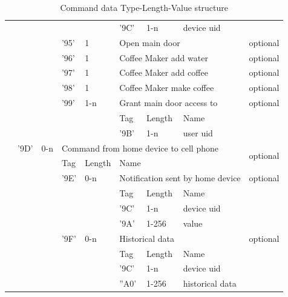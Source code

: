 \begin{table}[!htb]
{\begin{tabular}{|l|l|l|l|l|l|l|l|l|l|}
\multicolumn{2}{|l|}{} & \multicolumn{2}{l|}{} & \multicolumn{2}{l|}{} & '9C' & 1-n & device uid &  \\ \cline{5-10} 
\multicolumn{2}{|l|}{} & \multicolumn{2}{l|}{} & '95' & 1 & \multicolumn{3}{l|}{Open main door} & optional \\ \cline{5-10} 
\multicolumn{2}{|l|}{} & \multicolumn{2}{l|}{} & '96' & 1 & \multicolumn{3}{l|}{Coffee Maker add water} & optional \\ \cline{5-10} 
\multicolumn{2}{|l|}{} & \multicolumn{2}{l|}{} & '97' & 1 & \multicolumn{3}{l|}{Coffee Maker add coffee} & optional \\ \cline{5-10} 
\multicolumn{2}{|l|}{} & \multicolumn{2}{l|}{} & '98' & 1 & \multicolumn{3}{l|}{Coffee Maker make coffee} & optional \\ \cline{5-10} 
\multicolumn{2}{|l|}{} & \multicolumn{2}{l|}{} & '99' & 1-n & \multicolumn{3}{l|}{Grant main door access to} & optional \\ \cline{5-10} 
\multicolumn{2}{|l|}{} & \multicolumn{2}{l|}{} & \multicolumn{2}{l|}{\multirow{2}{*}{}} & Tag & Length & Name & \multirow{2}{*}{} \\ \cline{7-9}
\multicolumn{2}{|l|}{} & \multicolumn{2}{l|}{} & \multicolumn{2}{l|}{} & '9B' & 1-n & user uid &  \\ \cline{3-10} 
\multicolumn{2}{|l|}{} & '9D' & 0-n & \multicolumn{5}{l|}{Command from home device to cell phone} & \multirow{2}{*}{optional} \\ \cline{3-9}
\multicolumn{2}{|l|}{} & \multicolumn{2}{l|}{\multirow{9}{*}{}} & Tag & Length & \multicolumn{3}{l|}{Name} &  \\ \cline{5-10} 
\multicolumn{2}{|l|}{} & \multicolumn{2}{l|}{} & '9E' & 0-n & \multicolumn{3}{l|}{Notification sent by home device} & optional \\ \cline{5-10} 
\multicolumn{2}{|l|}{} & \multicolumn{2}{l|}{} & \multicolumn{2}{l|}{\multirow{3}{*}{}} & Tag & Length & Name & \multirow{3}{*}{} \\ \cline{7-9}
\multicolumn{2}{|l|}{} & \multicolumn{2}{l|}{} & \multicolumn{2}{l|}{} & '9C' & 1-n & device uid &  \\ \cline{7-9}
\multicolumn{2}{|l|}{} & \multicolumn{2}{l|}{} & \multicolumn{2}{l|}{} & '9A' & 1-256 & value &  \\ \cline{5-10} 
\multicolumn{2}{|l|}{} & \multicolumn{2}{l|}{} & '9F' & 0-n & \multicolumn{3}{l|}{Historical data} & optional \\ \cline{5-10} 
\multicolumn{2}{|l|}{} & \multicolumn{2}{l|}{} & \multicolumn{2}{l|}{\multirow{3}{*}{}} & Tag & Length & Name & \multirow{3}{*}{} \\ \cline{7-9}
\multicolumn{2}{|l|}{} & \multicolumn{2}{l|}{} & \multicolumn{2}{l|}{} & '9C' & 1-n & device uid &  \\ \cline{7-9}
\multicolumn{2}{|l|}{} & \multicolumn{2}{l|}{} & \multicolumn{2}{l|}{} & ''A0' & 1-256 & historical data &  \\ \hline
\end{tabular}
}
\caption{Command data Type-Length-Value structure}
\label{tlv}
\end{table}

